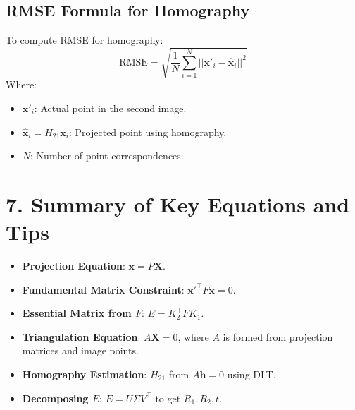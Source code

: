 \documentclass[a4paper,10pt]{article}
\begin{document}
\subsection*{RMSE Formula for Homography}
To compute RMSE for homography:
\[
\text{RMSE} = \sqrt{\frac{1}{N} \sum_{i=1}^N ||\mathbf{x}'_i - \hat{\mathbf{x}}_i||^2}
\]
Where:
\begin{itemize}
    \item $\mathbf{x}'_i$: Actual point in the second image.
    \item $\hat{\mathbf{x}}_i = H_{21} \mathbf{x}_i$: Projected point using homography.
    \item $N$: Number of point correspondences.
\end{itemize}

\section*{7. Summary of Key Equations and Tips}

\begin{itemize}
    \item \textbf{Projection Equation}: $\mathbf{x} = P \mathbf{X}$.
    \item \textbf{Fundamental Matrix Constraint}: $\mathbf{x'}^\top F \mathbf{x} = 0$.
    \item \textbf{Essential Matrix from $F$}: $E = K_2^\top F K_1$.
    \item \textbf{Triangulation Equation}: $A \mathbf{X} = 0$, where $A$ is formed from projection matrices and image points.
    \item \textbf{Homography Estimation}: $H_{21}$ from $A \mathbf{h} = 0$ using DLT.
    \item \textbf{Decomposing $E$}: $E = U \Sigma V^\top$ to get $R_1, R_2, t$.
\end{itemize}
\end{document}
